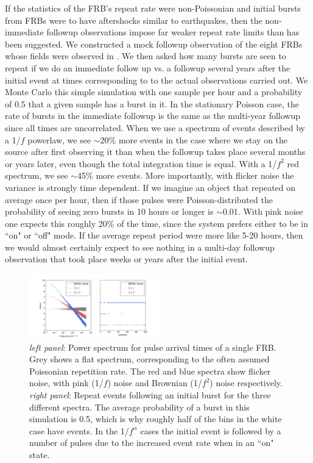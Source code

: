 \documentclass[useAMS,usenatbib]{mn2e}
\begin{document}
If the statistics of the FRB's repeat rate were
non-Poissonian and initial bursts from FRBs were to have aftershocks
similar to earthquakes, then the non-immediate followup observations 
impose far weaker repeat rate limits than has been suggested. We 
constructed a mock followup observation of the eight FRBs whose
fields were observed in \cite{2015MNRAS.454..457P}. We then 
asked how many bursts are seen to repeat if we do an immediate
follow up vs. a followup several years after the initial event 
at times corresponding to 
to the actual observations carried out. We Monte Carlo this 
simple simulation with one sample per hour and a probability of 0.5 
that a given sample has a burst in it. 
In the stationary Poisson case, the rate of bursts in 
the immediate followup is the same as the multi-year followup 
since all times are 
uncorrelated. When we use a spectrum of events described by 
a 1/$f$ powerlaw, we see $\sim$20$\%$ more events in the case where we
stay on the source after first observing it than when the followup takes 
place several months or years later, even though the total integration time 
is equal. With a 1/$f^2$ red spectrum, 
we see $\sim$45$\%$ more events. More importantly, with flicker noise 
the variance is strongly time dependent. If we imagine an object that 
repeated on average once per hour, then if those pulses were Poisson-distributed 
the probability of seeing zero bursts in 10 hours or longer is $\sim$0.01. With 
pink noise one expects this roughly 20$\%$ of the time, since the system 
prefers either to be in ``on" or ``off" mode. If the average repeat period were more 
like 5-20 hours, then we would almost certainly expect to see nothing in a multi-day followup 
observation that took place weeks or years after the initial event.


\begin{figure}
  \centering
   \includegraphics[trim={.5in, 0in, .5in, 0in}, width=0.5\textwidth, height=0.27\textwidth]{frb_sim_pink.png}
   \caption{\textit{left panel}: Power spectrum for pulse arrival times of a single FRB.
   Grey shows a flat spectrum, corresponding to the often assumed Poissonian 
   repetition rate. The red and blue spectra show flicker noise, with pink (1/$f$) 
   noise and Brownian (1/$f^2$) noise respectively. \textit{right panel}: 
   Repeat events following an initial burst for the three different spectra. The average 
   probability of a burst in this simulation is 0.5, which is why roughly half of the 
   bins in the white case have events. In the 1/$f^\alpha$ cases the initial event 
   is followed by a number of pulses due to the increased event rate when in an 
   ``on" state.}
   \label{FIG-RATE}
\end{figure}
\end{document}
